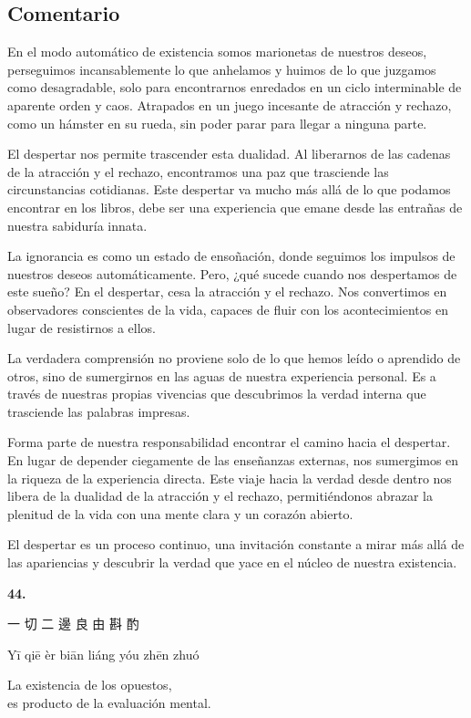\documentclass[
  a5paperpaper,
]{article}
\begin{document}
\hfill\break

\hypertarget{comentario-42}{%
\subsection{Comentario}\label{comentario-42}}

En el modo automático de existencia somos marionetas de nuestros deseos,
perseguimos incansablemente lo que anhelamos y huimos de lo que juzgamos
como desagradable, solo para encontrarnos enredados en un ciclo
interminable de aparente orden y caos. Atrapados en un juego incesante
de atracción y rechazo, como un hámster en su rueda, sin poder parar
para llegar a ninguna parte.

El despertar nos permite trascender esta dualidad. Al liberarnos de las
cadenas de la atracción y el rechazo, encontramos una paz que trasciende
las circunstancias cotidianas. Este despertar va mucho más allá de lo
que podamos encontrar en los libros, debe ser una experiencia que emane
desde las entrañas de nuestra sabiduría innata.

La ignorancia es como un estado de ensoñación, donde seguimos los
impulsos de nuestros deseos automáticamente. Pero, ¿qué sucede cuando
nos despertamos de este sueño? En el despertar, cesa la atracción y el
rechazo. Nos convertimos en observadores conscientes de la vida, capaces
de fluir con los acontecimientos en lugar de resistirnos a ellos.

La verdadera comprensión no proviene solo de lo que hemos leído o
aprendido de otros, sino de sumergirnos en las aguas de nuestra
experiencia personal. Es a través de nuestras propias vivencias que
descubrimos la verdad interna que trasciende las palabras impresas.

Forma parte de nuestra responsabilidad encontrar el camino hacia el
despertar. En lugar de depender ciegamente de las enseñanzas externas,
nos sumergimos en la riqueza de la experiencia directa. Este viaje hacia
la verdad desde dentro nos libera de la dualidad de la atracción y el
rechazo, permitiéndonos abrazar la plenitud de la vida con una mente
clara y un corazón abierto.

El despertar es un proceso continuo, una invitación constante a mirar
más allá de las apariencias y descubrir la verdad que yace en el núcleo
de nuestra existencia.

\hfill\break

\hypertarget{04}{}
\begin{verseblock}

\newpage

\begin{center}\textbf{44.}\end{center}

一 切 二 邊 良 由 斟 酌

Yī qiē èr biān liáng yóu zhēn zhuó

La existencia de los opuestos,\\
es producto de la evaluación mental.

\end{verseblock}
\end{document}
